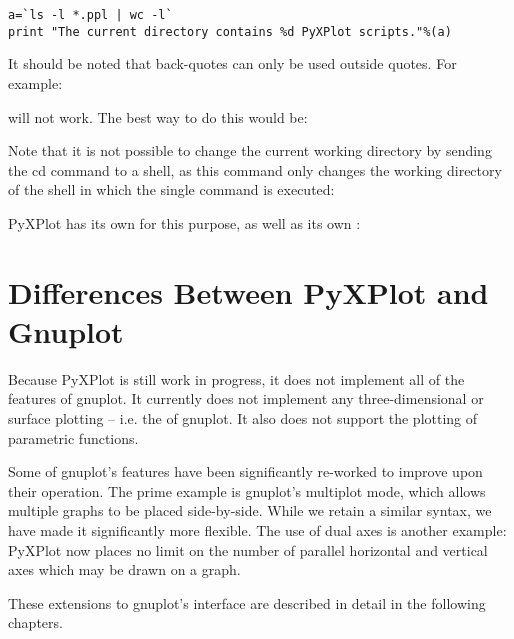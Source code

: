 \begin{verbatim}
a=`ls -l *.ppl | wc -l`
print "The current directory contains %d PyXPlot scripts."%(a)
\end{verbatim}

It should be noted that back-quotes can only be used outside quotes. For
example:


\noindent will not work. The best way to do this would be:


Note that it is not possible to change the current working directory by sending
the cd command to a shell, as this command only changes the working directory
of the shell in which the single command is executed:


PyXPlot has its own  for this purpose, as well as its own
:


\section{Differences Between PyXPlot and Gnuplot}
\label{missing_features}

Because PyXPlot is still work in progress, it does not implement all of the
features of gnuplot. It currently does not implement any three-dimensional or
surface plotting -- i.e. the  of gnuplot. It also does not
support the plotting of parametric functions.

Some of gnuplot's features have been significantly re-worked to improve upon
their operation. The prime example is gnuplot's multiplot mode, which allows
multiple graphs to be placed side-by-side. While we retain a similar syntax, we
have made it significantly more flexible. The use of dual axes is another
example: PyXPlot now places no limit on the number of parallel horizontal and
vertical axes which may be drawn on a graph.

These extensions to gnuplot's interface are described in detail in the
following chapters.
